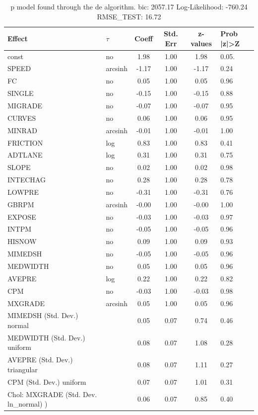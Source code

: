 \begin{table}
	\caption{p model found through the de algorithm. bic: 2057.17 Log-Likelihood: -760.24 RMSE_TEST: 16.72}
	\begin{center}
		\begin{tabular}{|l|l|c|c|c|l|}
			\hline
			Effect & $\tau$ & Coeff & Std. Err & z-values & Prob |z|>Z \\
			\hline
			const & no & 1.98 & 1.00 & 1.98 & 0.05. \\
			\hline
			SPEED & arcsinh & -1.17 & 1.00 & -1.17 & 0.24 \\
			\hline
			FC & no & 0.05 & 1.00 & 0.05 & 0.96 \\
			\hline
			SINGLE & no & -0.15 & 1.00 & -0.15 & 0.88 \\
			\hline
			MIGRADE & no & -0.07 & 1.00 & -0.07 & 0.95 \\
			\hline
			CURVES & no & 0.06 & 1.00 & 0.06 & 0.95 \\
			\hline
			MINRAD & arcsinh & -0.01 & 1.00 & -0.01 & 1.00 \\
			\hline
			FRICTION & log & 0.83 & 1.00 & 0.83 & 0.41 \\
			\hline
			ADTLANE & log & 0.31 & 1.00 & 0.31 & 0.75 \\
			\hline
			SLOPE & no & 0.02 & 1.00 & 0.02 & 0.98 \\
			\hline
			INTECHAG & no & 0.28 & 1.00 & 0.28 & 0.78 \\
			\hline
			LOWPRE & no & -0.31 & 1.00 & -0.31 & 0.76 \\
			\hline
			GBRPM & arcsinh & -0.00 & 1.00 & -0.00 & 1.00 \\
			\hline
			EXPOSE & no & -0.03 & 1.00 & -0.03 & 0.97 \\
			\hline
			INTPM & no & -0.05 & 1.00 & -0.05 & 0.96 \\
			\hline
			HISNOW & no & 0.09 & 1.00 & 0.09 & 0.93 \\
			\hline
			MIMEDSH & no & -0.05 & 1.00 & -0.05 & 0.96 \\
			\hline
			MEDWIDTH & no & 0.05 & 1.00 & 0.05 & 0.96 \\
			\hline
			AVEPRE & log & 0.22 & 1.00 & 0.22 & 0.82 \\
			\hline
			CPM & no & -0.03 & 1.00 & -0.03 & 0.98 \\
			\hline
			MXGRADE & arcsinh & 0.05 & 1.00 & 0.05 & 0.96 \\
			\hline
			MIMEDSH (Std. Dev.) normal &  & 0.05 & 0.07 & 0.74 & 0.46 \\
			\hline
			MEDWIDTH (Std. Dev.) uniform &  & 0.08 & 0.07 & 1.08 & 0.28 \\
			\hline
			AVEPRE (Std. Dev.) triangular &  & 0.08 & 0.07 & 1.11 & 0.27 \\
			\hline
			CPM (Std. Dev.) uniform &  & 0.07 & 0.07 & 1.01 & 0.31 \\
			\hline
			 Chol: MXGRADE (Std. Dev. ln_normal) ) &  & 0.06 & 0.07 & 0.85 & 0.40 \\
			\hline
		\end{tabular}
	\end{center}
\end{table}